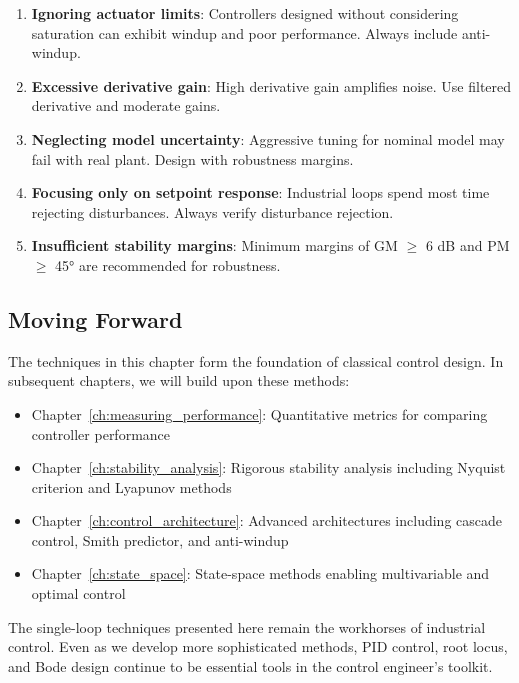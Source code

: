 \begin{enumerate}
    \item \textbf{Ignoring actuator limits}: Controllers designed without considering saturation can exhibit windup and poor performance. Always include anti-windup.

    \item \textbf{Excessive derivative gain}: High derivative gain amplifies noise. Use filtered derivative and moderate gains.

    \item \textbf{Neglecting model uncertainty}: Aggressive tuning for nominal model may fail with real plant. Design with robustness margins.

    \item \textbf{Focusing only on setpoint response}: Industrial loops spend most time rejecting disturbances. Always verify disturbance rejection.

    \item \textbf{Insufficient stability margins}: Minimum margins of GM $\geq$ 6 dB and PM $\geq$ 45° are recommended for robustness.
\end{enumerate}

\subsection{Moving Forward}

The techniques in this chapter form the foundation of classical control design. In subsequent chapters, we will build upon these methods:

\begin{itemize}
    \item Chapter~\ref{ch:measuring_performance}: Quantitative metrics for comparing controller performance
    \item Chapter~\ref{ch:stability_analysis}: Rigorous stability analysis including Nyquist criterion and Lyapunov methods
    \item Chapter~\ref{ch:control_architecture}: Advanced architectures including cascade control, Smith predictor, and anti-windup
    \item Chapter~\ref{ch:state_space}: State-space methods enabling multivariable and optimal control
\end{itemize}

The single-loop techniques presented here remain the workhorses of industrial control. Even as we develop more sophisticated methods, PID control, root locus, and Bode design continue to be essential tools in the control engineer's toolkit.


